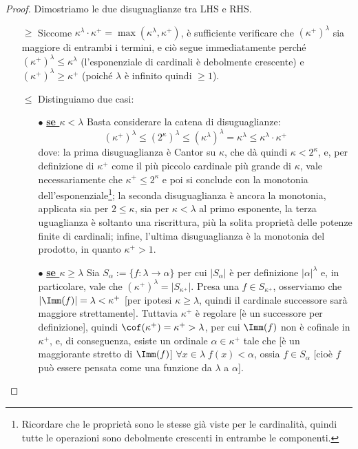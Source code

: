 \documentclass[11pt]{scrartcl}
\begin{document}
\begin{proof}
	Dimostriamo le due disuguaglianze tra LHS e RHS.
	\begin{itemize}
		\item[$\boxed{\geq}$] Siccome $\kappa^{\lambda} \cdot \kappa^+ = \max(\kappa^{\lambda}, \kappa^+)$, è sufficiente verificare che $(\kappa^+)^\lambda$ sia maggiore di entrambi i termini, e ciò segue immediatamente perché 
		$(\kappa^+)^\lambda \leq \kappa^{\lambda}$ (l'esponenziale di cardinali è debolmente crescente) e $(\kappa^+)^\lambda \geq \kappa^{+}$ (poiché $\lambda$ è infinito quindi $\geq 1$).
		\item[$\boxed{\leq}$] Distinguiamo due casi:
		\begin{itemize}
			\item[$\bullet$]\textbf{\underline{se $\kappa < \lambda$}} Basta considerare la catena di disuguaglianze:
			\[ (\kappa^+)^\lambda \leq (2^{\kappa})^\lambda \leq (\kappa^{\lambda})^\lambda = \kappa^{\lambda} \leq \kappa^{\lambda} \cdot \kappa^+
				\]
			dove: la prima disuguaglianza è Cantor su $\kappa$, che dà quindi $\kappa < 2^{\kappa}$, e, per definizione di $\kappa^+$ come il più piccolo cardinale più grande di $\kappa$, vale necessariamente che $\kappa^+ \leq 2^{\kappa}$ e poi si conclude con la monotonia dell'esponenziale\footnote{Ricordare che le proprietà sono le stesse 
			già viste per le cardinalità, quindi tutte le operazioni sono debolmente crescenti in entrambe le componenti.};
			la seconda disuguaglianza è ancora la monotonia, applicata sia per $2 \leq \kappa$, sia per $\kappa < \lambda$ al primo esponente, la terza uguaglianza è soltanto una riscrittura, più la solita proprietà delle potenze finite di cardinali; infine, l'ultima disuguaglianza è la monotonia del prodotto,
			in quanto $\kappa^+ > 1$. 
			\item[$\bullet$]\textbf{\underline{se $\kappa \geq \lambda$}} Sia $S_\alpha := \{f : \lambda \rightarrow \alpha\}$ per cui $|S_\alpha|$ è per definizione $|\alpha|^{\lambda}$ e, in particolare, vale che $(\kappa^+)^\lambda = |S_{\kappa^+}|$. Presa una $f \in S_{\kappa^+}$, osserviamo
			che $|\Imm(f)| = \lambda < \kappa^+$ [per ipotesi $\kappa \geq \lambda$, quindi il cardinale successore sarà maggiore strettamente].
			Tuttavia $\kappa^+$ è regolare [è un successore per definizione], quindi $\cof(\kappa^+) = \kappa^+ > \lambda$, per cui $\Imm(f)$ non è cofinale in $\kappa^+$, e, di conseguenza, esiste un ordinale $\alpha \in \kappa^+$ tale che [è un maggiorante stretto di $\Imm(f)$] $\forall x \in \lambda \; f(x) < \alpha$, ossia $f \in S_\alpha$ [cioè $f$ può essere pensata come una funzione da $\lambda$ a $\alpha$].

\end{itemize}
\end{itemize}
\end{proof}
\end{document}
